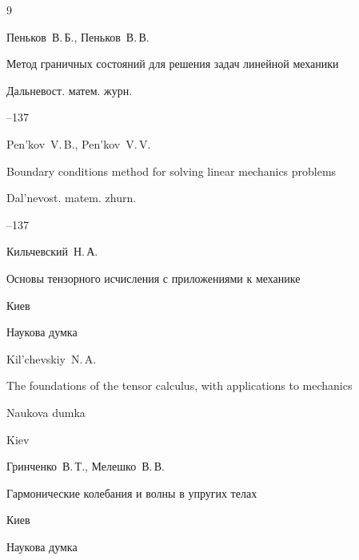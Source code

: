 \begin{thebibliography}{9}




\by Пеньков~В.\,Б., Пеньков~В.\,В.

\paper Метод граничных состояний для решения задач линейной механики

\jour Дальневост. матем. журн.




--137

\misctransl

\by Pen'kov~V.\,B., Pen'kov~V.\,V.

\paper Boundary conditions method for solving linear mechanics problems

\jour Dal'nevost. matem. zhurn.




--137




\by Кильчевский~Н.\,А.

\book Основы тензорного исчисления с приложениями к механике

\publaddr Киев

\publ Наукова думка



\misctransl

\by  Kil'chevskiy~N.\,A.

\book The foundations of the tensor calculus, with applications to mechanics

\publ Naukova dumka

\publaddr Kiev






\by Гринченко~В.\,Т., Мелешко~В.\,В.

\book Гармонические колебания и волны в упругих телах

\publaddr Киев

\publ Наукова думка




\end{thebibliography}
